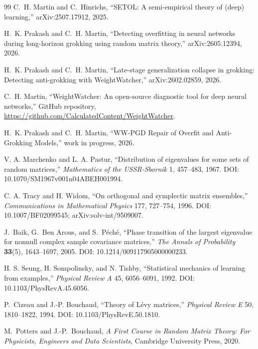 \documentclass[10pt,twocolumn]{article}
\begin{document}
\begin{thebibliography}{99}
C.~H. Martin and C.~Hinrichs, ``SETOL: A semi-empirical theory of (deep) learning,'' arXiv:2507.17912, 2025.

H.~K. Prakash and C.~H. Martin, ``Detecting overfitting in neural networks during long-horizon grokking using random matrix theory,'' arXiv:2605.12394, 2026.


H.~K. Prakash and C.~H. Martin, ``Late-stage generalization collapse in grokking: Detecting anti-grokking with WeightWatcher,'' arXiv:2602.02859, 2026.

  C.~H. Martin, ``WeightWatcher: An open-source diagnostic tool for deep neural networks,'' GitHub repository, \url{https://github.com/CalculatedContent/WeightWatcher}.

H.~K. Prakash and C.~H. Martin,
``WW-PGD Repair of Overfit and Anti-Grokking Models,''
work in progress, 2026.

V. A. Marchenko and L. A. Pastur,
``Distribution of eigenvalues for some sets of random matrices,''
\emph{Mathematics of the USSR-Sbornik} 1, 457--483, 1967. DOI: 10.1070/SM1967v001n04ABEH001994.

C. A. Tracy and H. Widom,
``On orthogonal and symplectic matrix ensembles,''
\emph{Communications in Mathematical Physics} 177, 727--754, 1996. DOI: 10.1007/BF02099545; arXiv:solv-int/9509007.

J.~Baik, G.~Ben Arous, and S.~P\'ech\'e,
``Phase transition of the largest eigenvalue for nonnull complex sample covariance matrices,''
\emph{The Annals of Probability} \textbf{33}(5), 1643--1697, 2005.
DOI: 10.1214/009117905000000233.

H. S. Seung, H. Sompolinsky, and N. Tishby,
``Statistical mechanics of learning from examples,''
\emph{Physical Review A} 45, 6056--6091, 1992.
DOI: 10.1103/PhysRevA.45.6056.

P.~Cizeau and J.-P. Bouchaud, ``Theory of L\'evy matrices,'' \emph{Physical Review E} 50, 1810--1822, 1994. DOI: 10.1103/PhysRevE.50.1810.

M.~Potters and J.-P.~Bouchaud, \emph{A First Course in Random Matrix Theory: For Physicists, Engineers and Data Scientists}, Cambridge University Press, 2020.


\end{thebibliography}
\end{document}
